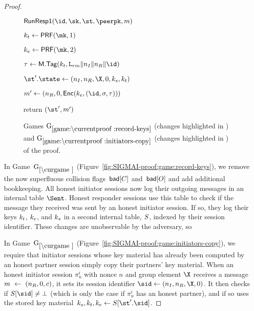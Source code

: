 \begin{proof}
\begin{collectinmacro}{\SIGMIProofRecordKeysInitiatorsCopy}{}{}
\begin{figure}[tp]
\begin{minipage}[t]{0.49\textwidth}
\begin{oracle}{$\RunRespI(\id,\sk,\st,\peerpk,m)$}
      \item $\kt \gets \PRF(\mk,1)$
      \item $\ke \gets \PRF(\mk,2)$
      \item {}
      \item \hindent \gamechange{$\S[\st'.\sid] \gets (\ks,\kt,\ke)$}
      \item $\tau \gets \MACScheme.\MACTag(\kt, \labelrm\|\nonce_I\|\nonce_R\|\id)$
      \item $\st'.\state \gets (\nonce_I,\nonce_R,\X,\Y,\ks,\kt)$
      \item $m' \gets (\nonce_R, \Y, \ENCEnc(\ke,(\id,\sigma,\tau)))$
      \item return $(\st',m')$
    \end{oracle}
  \end{minipage}
	\caption[]{%
		Games $\lblGm{record-keys}$ (changes highlighted in ) and $\lblGm{initiators-copy}$ (changes highlighted in ) of the \SIGMAI proof.
	}
	\label{fig:SIGMAI-proof:game:record-keys}
	\label{fig:SIGMAI-proof:game:initiators-copy}

  	\iffull\else %
	\label{apxfig:SIGMAI-proof:record-keys--initiators-copy}
	\fi
\end{figure}
\end{collectinmacro}



In Game~$\curGm$ (Figure~\ref{fig:SIGMAI-proof:game:record-keys}\iffull{}\fi), we remove the now superfluous collision flags~$\bad[C]$ and~$\bad[O]$ and add additional bookkeeping.
All honest initiator sessions now log their outgoing messages in an internal table $\Sent$. 
Honest responder sessions use this table to check if the message they received was sent by an honest initiator session. 
If so, they log their keys $\kt$, $\ke$, and $\ks$ in a second internal table, $\S$, indexed by their session identifier. 
These changes are unobservable by the adversary, so



In Game~$\curGm$ (Figure~\ref{fig:SIGMAI-proof:game:initiators-copy}\iffull{}\fi), we require that initiator sessions whose key material has already been computed by an honest partner session simply copy their partners' key material.
When an honest initiator session $\pi_u^i$ with nonce $n$ and group element $\X$ receives a message $m~\gets~(\nonce_R,\Y, \ciph)$, it sets its session identifier $\sid \gets (\nonce_I,\nonce_R,\X,\Y)$. 
It then checks if $\S[\sid] \neq \bot$ (which is only the case if $\pi_u^i$ has an honest partner),
and if so uses the stored key material~$\ks,\kt,\ke \gets \S[\st'.\sid]$. 


\end{proof}
